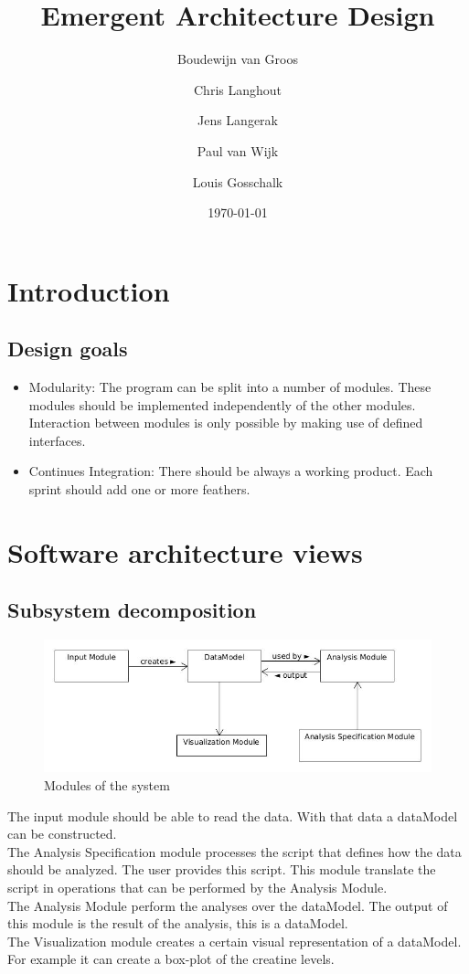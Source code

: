 \documentclass[a4paper]{article}
\title{Emergent Architecture Design}
\author[1]{Boudewijn van Groos}
\author[2]{Chris Langhout}
\author[3]{Jens Langerak}
\author[4]{Paul van Wijk}
\author[5]{Louis Gosschalk}
\affil[1]{bvangroos \\
4229843}
\affil[2]{clanghout \\
4281705}
\affil[3]{jlangerak \\
4317327}
\affil[4]{pjvanwijk \\
4285034}
\affil[5]{lgosschalk \\
4214528}
\date{\today}
\begin{document}
\maketitle
\tableofcontents
\newpage

\section{Introduction}
\subsection{Design goals}
 	\begin{itemize}
    \item Modularity:
    The program can be split into a number of modules. These modules should be implemented independently of the other modules. Interaction between modules is only possible by making use of defined interfaces.
    \item Continues Integration: There should be always a working product. Each sprint should add one or more feathers. 
		\end{itemize}

\section{Software architecture views}
\subsection{Subsystem decomposition}

\begin{figure}[h]
	\centering
   	\includegraphics[scale=0.6]{images/modules.jpg}
    \caption{Modules of the system}
    \label{fig:modules}
\end{figure}
The input module should be able to read the data. With that data a dataModel can be constructed. \\
The Analysis Specification module processes the script that defines how the data should be analyzed. The user provides this script. This module translate the script in operations that can be performed by the Analysis Module.\\
The Analysis Module perform the analyses over the dataModel. The output of this module is the result of the analysis, this is a dataModel.\\
The Visualization module creates a certain visual representation of a dataModel. For example it can create a box-plot of the creatine levels.
\end{document}
